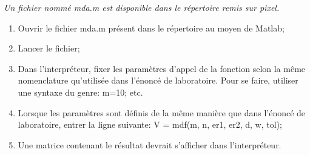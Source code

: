 \textit{Un fichier nommé mda.m est disponible dans le répertoire remis sur pixel.}
\begin{enumerate}
\item Ouvrir le fichier mda.m présent dans le répertoire au moyen de Matlab;
\item Lancer le fichier;
\item Dans l'interpréteur, fixer les paramètres d'appel de la fonction selon la même nomenclature qu'utilisée dans l'énoncé de laboratoire. Pour se faire, utiliser une syntaxe du genre: m=10; etc. 
\item Lorsque les paramètres sont définis de la même manière que dans l'énoncé de laboratoire, entrer la ligne suivante: V  = mdf(m, n, er1, er2, d, w, tol);
\item Une matrice contenant le résultat devrait s'afficher dans l'interpréteur. 
\end{enumerate}